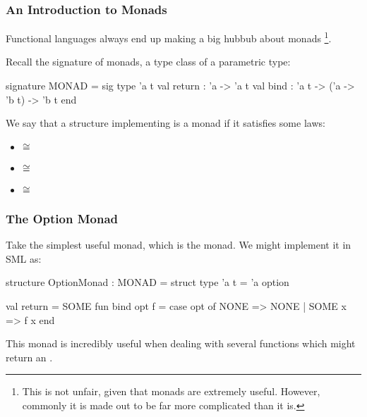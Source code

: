 \documentclass[aspectratio=169, handout]{beamer}
\begin{document}
\begin{frame}[fragile]
  \frametitle{An Introduction to Monads}

  Functional languages always end up making a big hubbub about monads
  \footnote{This is not unfair, given that monads are extremely useful. However,
  commonly it is made out to be far more complicated than it is.}.

  \vspace{\fill}

  Recall the signature of monads, a type class of a parametric type:

  {\small
  \begin{codeblock}
    signature MONAD =
      sig
        type 'a t
        val return : 'a -> 'a t
        val bind : 'a t -> ('a -> 'b t) -> 'b t
      end
  \end{codeblock}
  }

  \vspace{\fill}

  We say that a structure implementing  is a monad if
  it satisfies some laws:
  \begin{itemize}
    \item {} $\cong$ 
    \item {} $\cong$ 
    \item {} $\cong$ 
  \end{itemize}
\end{frame}


\begin{frame}[fragile]
  \frametitle{The Option Monad}

  Take the simplest useful monad, which is the  monad. We might
  implement it in SML as:

  \vspace{\fill}

  {\small
  \begin{codeblock}
    structure OptionMonad : MONAD =
      struct
        type 'a t = 'a option

        val return = SOME
        fun bind opt f =
          case opt of
            NONE   => NONE
          | SOME x => f x
      end
  \end{codeblock}
  }

  \vspace{\fill}

  This monad is incredibly useful when dealing with several functions which might
  return an .
\end{frame}
\end{document}
